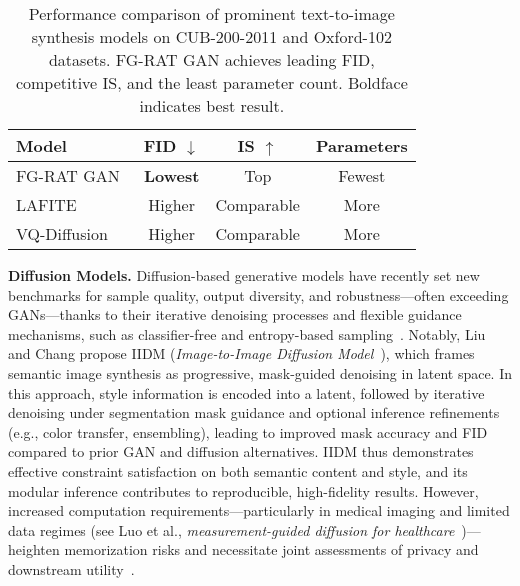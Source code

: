 \documentclass[sigconf]{acmart}
\begin{document}
\begin{table*}[htbp]
\centering
\caption{Performance comparison of prominent text-to-image synthesis models on CUB-200-2011 and Oxford-102 datasets. FG-RAT GAN achieves leading FID, competitive IS, and the least parameter count. Boldface indicates best result.}
\label{tab:fg-rat-performance}
\begin{adjustbox}{max width=\textwidth}
\begin{tabular}{@{}lccc@{}}
\toprule
Model & FID $\downarrow$ & IS $\uparrow$ & Parameters \\
\midrule
FG-RAT GAN~\cite{ref101} & \textbf{Lowest} & Top & Fewest\\
LAFITE~\cite{ref101} & Higher & Comparable & More\\
VQ-Diffusion~\cite{ref101} & Higher & Comparable & More\\
\bottomrule
\end{tabular}
\end{adjustbox}
\end{table*}

\textbf{Diffusion Models.} Diffusion-based generative models have recently set new benchmarks for sample quality, output diversity, and robustness—often exceeding GANs—thanks to their iterative denoising processes and flexible guidance mechanisms, such as classifier-free and entropy-based sampling~\cite{ref62,ref64,ref91,ref93}. Notably, Liu and Chang propose IIDM (\textit{Image-to-Image Diffusion Model}~\cite{ref102}), which frames semantic image synthesis as progressive, mask-guided denoising in latent space. In this approach, style information is encoded into a latent, followed by iterative denoising under segmentation mask guidance and optional inference refinements (e.g., color transfer, ensembling), leading to improved mask accuracy and FID compared to prior GAN and diffusion alternatives. IIDM thus demonstrates effective constraint satisfaction on both semantic content and style, and its modular inference contributes to reproducible, high-fidelity results. However, increased computation requirements—particularly in medical imaging and limited data regimes (see Luo et al., \textit{measurement-guided diffusion for healthcare}~\cite{ref91})—heighten memorization risks and necessitate joint assessments of privacy and downstream utility~\cite{ref87,ref95}.
\end{document}
